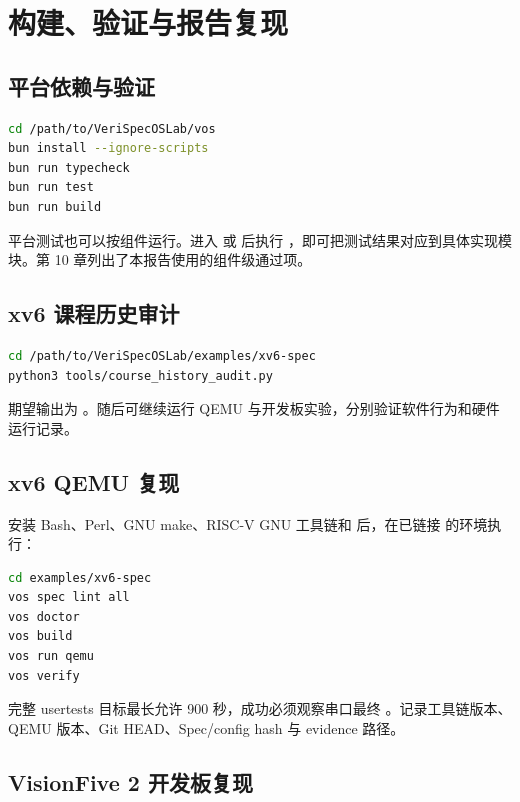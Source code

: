 \chapter{构建、验证与报告复现}

\section{平台依赖与验证}

\begin{lstlisting}[language=bash]
cd /path/to/VeriSpecOSLab/vos
bun install --ignore-scripts
bun run typecheck
bun run test
bun run build
\end{lstlisting}

平台测试也可以按组件运行。进入  或  后执行 ，即可把测试结果对应到具体实现模块。第 10 章列出了本报告使用的组件级通过项。

\section{xv6 课程历史审计}

\begin{lstlisting}[language=bash]
cd /path/to/VeriSpecOSLab/examples/xv6-spec
python3 tools/course_history_audit.py
\end{lstlisting}

期望输出为 。随后可继续运行 QEMU 与开发板实验，分别验证软件行为和硬件运行记录。

\section{xv6 QEMU 复现}

安装 Bash、Perl、GNU make、RISC-V GNU 工具链和  后，在已链接  的环境执行：

\begin{lstlisting}[language=bash]
cd examples/xv6-spec
vos spec lint all
vos doctor
vos build
vos run qemu
vos verify
\end{lstlisting}

完整 usertests 目标最长允许 900 秒，成功必须观察串口最终 。记录工具链版本、QEMU 版本、Git HEAD、Spec/config hash 与 evidence 路径。

\section{VisionFive 2 开发板复现}

